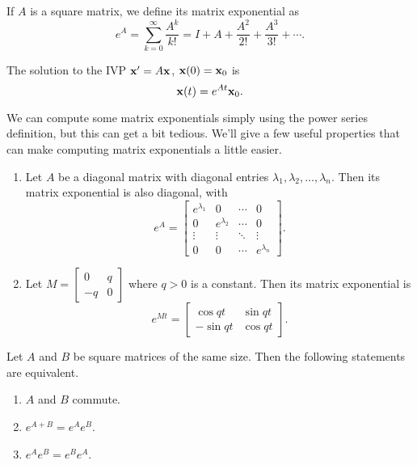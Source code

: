 \documentclass[../m082main.tex]{subfiles}
\begin{document}
\begin{definition}
    If $A$ is a square matrix, we define its matrix exponential as
    \[ e^{A} = \sum_{k = 0}^\infty \frac{A^{k}}{k!} = I + A + \frac{A^2}{2!} + \frac{A^3}{3!} + \cdots. \]
\end{definition}

\begin{theorem}
    The solution to the IVP $\mathbf{x}' = A \mathbf{x}$, $\mathbf{x}(0) = \mathbf{x}_0$ is
    \[ \mathbf{x}(t) = e^{At} \mathbf{x}_0. \]
\end{theorem}

We can compute some matrix exponentials simply using the power series definition, but this can get a bit tedious.
We'll give a few useful properties that can make computing matrix exponentials a little easier.

\begin{theorem}
    \begin{enumerate}[label=(\alph*)]
        \item Let $A$ be a diagonal matrix with diagonal entries $\lambda_1, \lambda_2, \ldots, \lambda_n$.
        Then its matrix exponential is also diagonal, with
        \[ e^{A} = \begin{bmatrix} e^{\lambda_1} & 0 & \cdots & 0 \\ 0 & e^{\lambda_2} & \cdots & 0 \\ \vdots & \vdots & \ddots & \vdots \\ 0 & 0 & \cdots & e^{\lambda_n} \end{bmatrix}. \]
        \item Let $M = \begin{bmatrix} 0 & q \\ -q & 0 \end{bmatrix}$ where $q > 0$ is a constant.
        Then its matrix exponential is
        \[ e^{Mt} = \begin{bmatrix} \cos qt & \sin qt \\ -\sin qt & \cos qt \end{bmatrix}. \]
    \end{enumerate}
\end{theorem}

\begin{theorem}
    Let $A$ and $B$ be square matrices of the same size.
    Then the following statements are equivalent.
    \begin{enumerate}[label=(\alph*)]
        \item $A$ and $B$ commute.
        \item $e^{A + B} = e^{A} e^{B}$.
        \item $e^{A} e^{B} = e^{B} e^{A}$.
    \end{enumerate}
\end{theorem}
\end{document}
